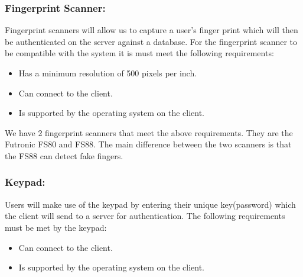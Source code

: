 	\subsubsection{Fingerprint Scanner:}
	Fingerprint scanners will allow us to capture a user's finger print which will then be authenticated on the server against a database. For the fingerprint scanner to be compatible with the system it is must meet the following requirements:
	\begin{itemize}
		\item Has a minimum resolution of 500 pixels per inch.
		\item Can connect to the client.
		\item Is supported by the operating system on the client.
	\end{itemize}
	
We have 2 fingerprint scanners that meet the above requirements. They are the Futronic FS80 and FS88. The main difference between the two scanners is that the FS88 can detect fake fingers.
	
	\subsubsection{Keypad:}
	Users will make use of the keypad by entering their unique key(password) which the client will send to a server for authentication. The following requirements must be met by the keypad:
	\begin{itemize}
		\item Can connect to the client.
		\item Is supported by the operating system on the client.
	\end{itemize}


		